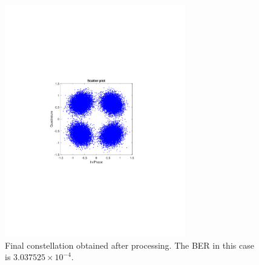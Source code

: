 \begin{refsection}
\begin{figure}[H]
	\centering
	\includegraphics[clip, trim=4cm 8cm 4cm 8cm,
	width=0.7\textwidth]{./sdf/m_qam_system/figures/expResults/homodyne/6_4GBdInSig13dB_const.pdf}
	\caption{Final constellation obtained after processing. The BER in this case is $3.037525 \times 10^{-4}$.}
	\label{fig:4GBdFinalHm}
\end{figure}


\end{refsection}

